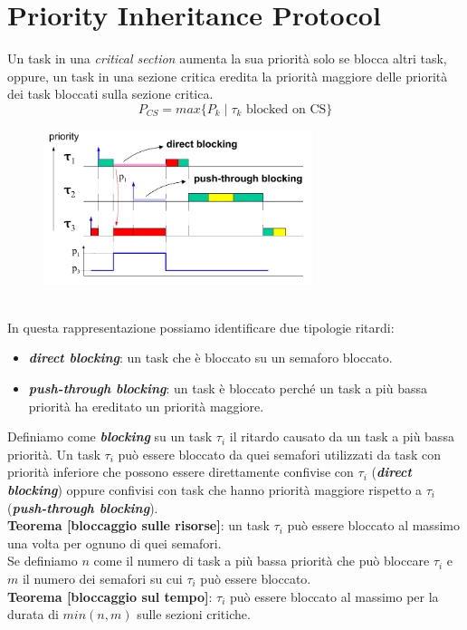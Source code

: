 \section{Priority Inheritance Protocol}
Un task in una \textit{critical section} aumenta la sua priorità solo se blocca altri task, oppure, un task in una sezione critica eredita la priorità maggiore delle priorità dei task bloccati sulla sezione critica. \[P_{CS} = max\{P_k \; | \; \tau_k \text{ blocked on CS}\}\]
\begin{figure}[h]
    \centering
    \includegraphics[width=0.7\textwidth]{img/pip}
\end{figure}
\\
In questa rappresentazione possiamo identificare due tipologie ritardi:
\begin{itemize}
    \item \textbf{\textit{direct blocking}}: un task che è bloccato su un semaforo bloccato.
    \item \textbf{\textit{push-through blocking}}: un task è bloccato perché un task a più bassa priorità ha ereditato un priorità maggiore.
\end{itemize}
Definiamo come \textbf{\textit{blocking}} su un task $\tau_i$ il ritardo causato da un task a più bassa priorità. Un task $\tau_i$ può essere bloccato da quei semafori utilizzati da task con priorità inferiore che possono essere direttamente confivise con $\tau_i$ (\textbf{\textit{direct blocking}}) oppure confivisi con task che hanno priorità maggiore rispetto a $\tau_i$ (\textbf{\textit{push-through blocking}}). \\
\textbf{Teorema [bloccaggio sulle risorse]}: un task $\tau_i$ può essere bloccato al massimo una volta per ognuno di quei semafori. \\
Se definiamo $n$ come il numero di task a più bassa priorità che può bloccare $\tau_i$ e $m$ il numero dei semafori su cui $\tau_i$ può essere bloccato. \\
\textbf{Teorema [bloccaggio sul tempo]}: $\tau_i$ può essere bloccato al massimo per la durata di $min(n, m)$ sulle sezioni critiche.

